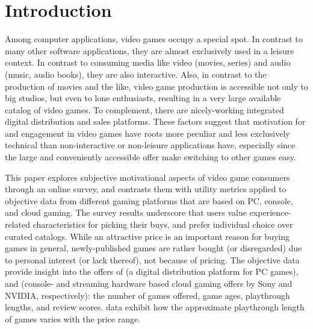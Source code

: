 
\section{Introduction}

Among computer applications, video games occupy a special spot.
In contrast to many other software applications, they are almost
exclusively used in a leisure context.
In contrast to consuming media like video (movies, series) and
audio (music, audio books), they are also interactive.
Also, in contrast to the production of movies and the like, video game
production is accessible not only to big studios, but even to lone
enthusiasts, resulting in a very large available catalog of video games.
To complement, there are nicely-working integrated digital distribution
and sales platforms.
These factors suggest that motivation for and engagement in video games
have roots more peculiar and less exclusively technical than
non-interactive or non-leisure applications have, especially since
the large and conveniently accessible offer make switching to other
games easy.

This paper explores subjective motivational aspects of video game
consumers through an online survey, and contrasts them with utility
metrics applied to objective data from different gaming platforms
that are based on PC, console, and cloud gaming.
The survey results underscore that users value experience-related
characteristics for picking their buys, and prefer individual choice
over curated catalogs. While an attractive price is an important
reason for buying games in general, newly-published games are rather
bought (or disregarded) due to personal interest (or lack thereof),
not because of pricing.
The objective data provide insight into the offers of \steam
(a digital distribution platform for PC games), \psnow and \gfnow
(console- and streaming hardware based cloud gaming offers by Sony
and NVIDIA, respectively): the number
of games offered, game ages, playthrough lengths, and review scores.
\steam data exhibit how the approximate playthrough length of games
varies with the price range.
